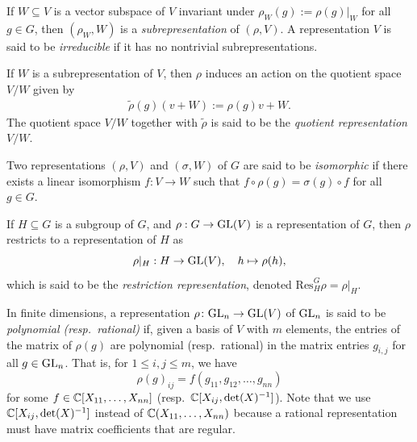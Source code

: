 \documentclass[11pt]{amsart}
\begin{document}
\begin{defin}
    If $W \subseteq V$ is a vector subspace of $V$ invariant under $\rho_W(g) := \rho(g) \big|_W$ for all $g \in G$, then $(\rho_W, W)$ is a \emph{subrepresentation} of $(\rho, V)$. A representation $V$ is said to be \emph{irreducible} if it has no nontrivial subrepresentations. 
\end{defin}
\begin{defin}
    If $W$ is a subrepresentation of $V$, then $\rho$ induces an action on the quotient space $V/W$ given by 
    \begin{align}
        \tilde{\rho}(g) (v+W):=\rho(g)v+W. \label{eq:quo-rho}
    \end{align}
    The quotient space $V/W$ together with $\tilde\rho $ is said to be the \emph{quotient representation} $V/W$. 
\end{defin}
\begin{defin}\label{def:isom-rep}
    Two representations $(\rho, V)$ and $(\sigma, W)$ of $G$ are said to be \emph{isomorphic} if there exists a linear isomorphism $f\colon V \to W$ such that $f \circ \rho(g) =\sigma(g)\circ f$ for all $g \in G$. 
\end{defin}

\begin{defin}
    If $H \subseteq G$ is a subgroup of $G$, and $\rho: G \to \mathrm{GL}(V)$ is a representation of $G$, then $\rho$ restricts to a representation of $H$ as 
    \begin{equation}
        \rho|_{H}: H \to \mathrm{GL}(V), \quad h \mapsto \rho(h),
    \end{equation}
    which is said to be the \emph{restriction representation}, denoted $\mathrm{Res}^G_H \rho=\rho|_H$.
\end{defin}



\begin{defin} \label{def:pol/rat-rep}
    In finite dimensions, a representation $\rho\colon \mathrm{GL}_n \to \mathrm{GL}(V)$ of $\mathrm{GL}_n$ is said to be \emph{polynomial (resp.\ rational)} if, given a basis of $V$ with $m$ elements, the entries of the matrix of $\rho(g)$ are polynomial (resp.\ rational) in the matrix entries \(g_{i,j}\) for all $g \in \mathrm{GL}_n$. That is, for $1\leq i, j \leq m$, we have
    \begin{equation}
        \rho(g)_{ij}=f(g_{11}, g_{12}, \dots, g_{nn})
    \end{equation}
    for some $f \in \mathbb{C}[X_{11}, \dots, X_{nn}]$ (resp.\ $\mathbb{C}[X_{ij}, \det(X)^{-1}]$). Note that we use $\mathbb{C}[X_{ij}, \det(X)^{-1}]$ instead of $\mathbb{C}(X_{11}, \dots, X_{nn})$ because a rational representation must have matrix coefficients that are regular.
\end{defin}
\end{document}
